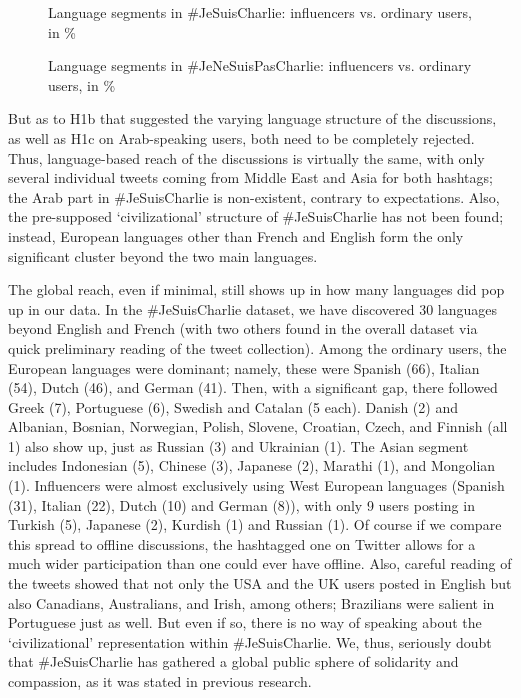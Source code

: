 \begin{figure}[ht]
	\caption{Language segments in \#JeSuisCharlie: influencers vs. ordinary users, in \%}\label{fig:jeSuisCharlieLanguageSegments}
\end{figure}

\begin{figure}[ht]
	\caption{Language segments in \#JeNeSuisPasCharlie: influencers vs. ordinary users, in \%}\label{fig:jeNeSuisPasCharlieLanguageSegments}
\end{figure}

But as to H1b that suggested the varying language structure of the discussions, as well as H1c on Arab-speaking users, both need to be completely rejected. Thus, language-based reach of the discussions is virtually the same, with only several individual tweets coming from Middle East and Asia for both hashtags; the Arab part in \#JeSuisCharlie is non-existent, contrary to expectations. Also, the pre-supposed ‘civilizational’ structure of \#JeSuisCharlie has not been found; instead, European languages other than French and English form the only significant cluster beyond the two main languages.

The global reach, even if minimal, still shows up in how many languages did pop up in our data. In the \#JeSuisCharlie dataset, we have discovered 30 languages beyond English and French (with two others found in the overall dataset via quick preliminary reading of the tweet collection). Among the ordinary users, the European languages were dominant; namely, these were Spanish (66), Italian (54), Dutch (46), and German (41). Then, with a significant gap, there followed Greek (7), Portuguese (6), Swedish and Catalan (5 each). Danish (2) and Albanian, Bosnian, Norwegian, Polish, Slovene, Croatian, Czech, and Finnish (all 1) also show up, just as Russian (3) and Ukrainian (1). The Asian segment includes Indonesian (5), Chinese (3), Japanese (2), Marathi (1), and Mongolian (1). Influencers were almost exclusively using West European languages (Spanish (31), Italian (22), Dutch (10) and German (8)), with only 9 users posting in Turkish (5), Japanese (2), Kurdish (1) and Russian (1). Of course if we compare this spread to offline discussions, the hashtagged one on Twitter allows for a much wider participation than one could ever have offline. Also, careful reading of the tweets showed that not only the USA and the UK users posted in English but also Canadians, Australians, and Irish, among others; Brazilians were salient in Portuguese just as well. But even if so, there is no way of speaking about the ‘civilizational’ representation within \#JeSuisCharlie. We, thus, seriously doubt that \#JeSuisCharlie has gathered a global public sphere of solidarity and compassion, as it was stated in previous research.


